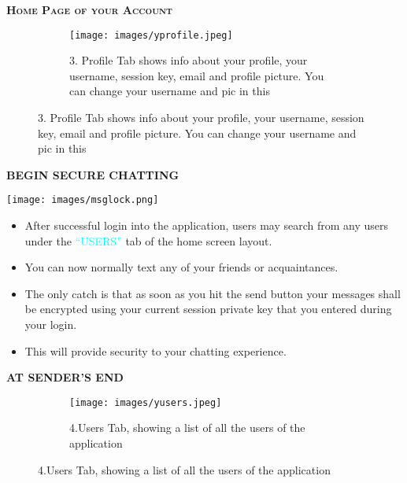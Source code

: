 \documentclass{beamer}
\begin{document}
\begin{frame}
\begin{tcolorbox}
\begin{center}
\textsc{\textbf{\textcolor{byzantium}{Home Page of your Account}}}
\end{center}
\end{tcolorbox}
\begin{figure}
\centering
\begin{subfigure}{\textwidth}
  \centering
  \texttt{[image: images/yprofile.jpeg]}
  \caption{3. Profile Tab shows info about your profile, your username, session key, email and profile picture. You can change your username and pic in this }
  \label{fig:sub1}
\end{subfigure}
\end{figure}
\end{frame}



\begin{frame}
\begin{tcolorbox}
\begin{center}
\textsc{\textbf{\textcolor{byzantium}{BEGIN SECURE CHATTING}}}
\end{center} 
\end{tcolorbox}
\begin{center}
 \texttt{[image: images/msglock.png]}
\end{center}
\begin{flushleft}
\begin{itemize}
\item After successful login into the application, users may search from any users under the \textcolor{cyan}{“USERS”} tab of the home screen layout.
\item You can now normally text any of your friends or acquaintances.
\item The only catch is that as soon as you hit the send button your messages shall be encrypted using your current session private key that you entered during your login.
\item This will provide security to your chatting experience. 
\end{itemize}
\end{flushleft}
\end{frame}



\begin{frame}
\begin{tcolorbox}
\begin{center}
\textsc{\textbf{\textcolor{byzantium}{AT SENDER'S END}}}
\end{center}
\end{tcolorbox}
\begin{figure}
\centering
\begin{subfigure}{\textwidth}
  \centering
  \texttt{[image: images/yusers.jpeg]}
  \caption{4.Users Tab, showing a list of all the users of the application  }
  \label{fig:sub1}
\end{subfigure}
\end{figure}
\end{frame}
\end{document}
